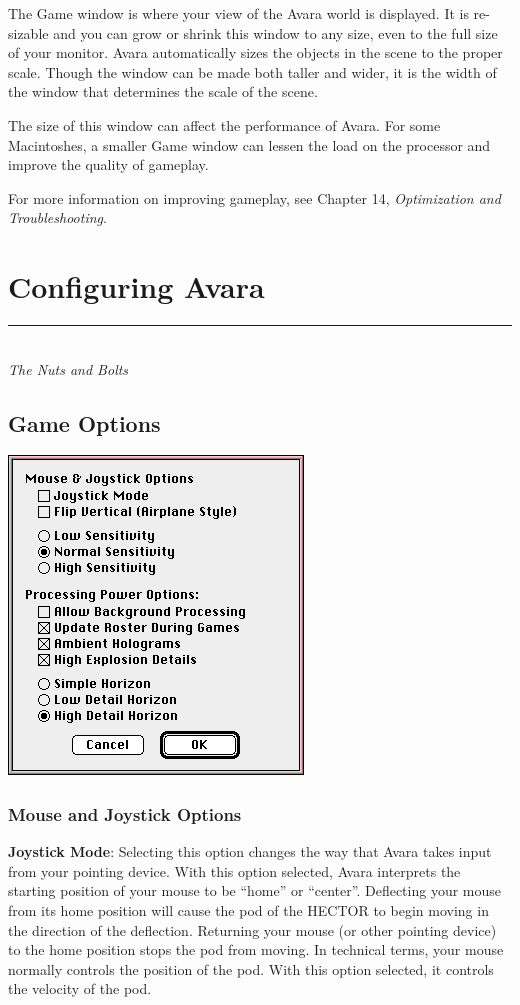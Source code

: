 \documentclass{article}
\let\oldsection\section
\renewcommand\section{\clearpage\oldsection}
\begin{document}
The Game window is where your view of the Avara world is displayed. It is re-sizable and you can grow or shrink this window to any size, even to the full size of your monitor. Avara automatically sizes the objects in the scene to the proper scale. Though the window can be made both taller and wider, it is the width of the window that determines the scale of the scene.

The size of this window can affect the performance of Avara. For some Macintoshes, a smaller Game window can lessen the load on the processor and improve the quality of gameplay.

For more information on improving gameplay, see Chapter 14, \textit{Optimization and Troubleshooting}.


\section{Configuring Avara}
\rule{5.5cm}{.15pt}\\
\rmfamily\textit{The Nuts and Bolts}

\subsection{Game Options}
\begin{center}
	\includegraphics{img/08.png}
\end{center}

\subsubsection{Mouse and Joystick Options}
\textbf{Joystick Mode}: Selecting this option changes the way that Avara takes input from your pointing device. With this option selected, Avara interprets the starting position of your mouse to be ``home'' or ``center''. Deflecting your mouse from its home position will cause the pod of the HECTOR to begin moving in the direction of the deflection. Returning your mouse (or other pointing device) to the home position stops the pod from moving. In technical terms, your mouse normally controls the position of the pod. With this option selected, it controls the velocity of the pod.
\end{document}
